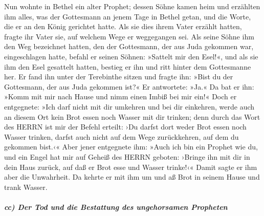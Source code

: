 Nun wohnte in Bethel ein alter Prophet; dessen Söhne
kamen heim und erzählten ihm alles, was der Gottesmann an jenem Tage in
Bethel getan, und die Worte, die er an den König gerichtet hatte. Als
sie dies ihrem Vater erzählt hatten, fragte ihr Vater
sie, auf welchem Wege er weggegangen sei. Als seine Söhne ihm den Weg
bezeichnet hatten, den der Gottesmann, der aus Juda gekommen war,
eingeschlagen hatte, befahl er seinen Söhnen: »Sattelt
mir den Esel!«, und als sie ihm den Esel gesattelt hatten, bestieg er
ihn und ritt hinter dem Gottesmanne her. Er fand ihn
unter der Terebinthe sitzen und fragte ihn: »Bist du der Gottesmann, der
aus Juda gekommen ist?« Er antwortete: »Ja.« Da bat er
ihn: »Komm mit mir nach Hause und nimm einen Imbiß bei mir ein!«
Doch er entgegnete: »Ich darf nicht mit dir umkehren und
bei dir einkehren, werde auch an diesem Ort kein Brot essen noch Wasser
mit dir trinken; denn durch das Wort des HERRN ist mir
der Befehl erteilt: ›Du darfst dort weder Brot essen noch Wasser
trinken, darfst auch nicht auf dem Wege zurückkehren, auf dem du
gekommen bist.‹« Aber jener entgegnete ihm: »Auch ich bin
ein Prophet wie du, und ein Engel hat mir auf Geheiß des HERRN geboten:
›Bringe ihn mit dir in dein Haus zurück, auf daß er Brot esse und Wasser
trinke!‹« Damit sagte er ihm aber die Unwahrheit. Da
kehrte er mit ihm um und aß Brot in seinem Hause und trank Wasser.

\hypertarget{cc-der-tod-und-die-bestattung-des-ungehorsamen-propheten}{%
\subparagraph{cc) Der Tod und die Bestattung des ungehorsamen
Propheten}\label{cc-der-tod-und-die-bestattung-des-ungehorsamen-propheten}}


